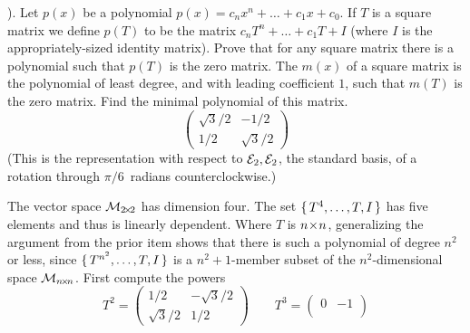 \begin{exercises}
\begin{exparts}
        ).
      \partsitem Let \( p(x) \) be a polynomial 
        \( p(x)=c_nx^n+\dots+c_1x+c_0 \).
        If \( T \) is a square matrix we define \( p(T) \) to be the matrix
        \( c_nT^n+\dots+c_1T+I \)
        (where $I$ is the appropriately-sized identity matrix).
        Prove that for any square matrix there is a polynomial such that
        \( p(T) \) is the zero matrix.
      \partsitem The %
        $m(x)$ of a square matrix is the
        polynomial of least degree, and with leading coefficient \( 1 \),
        such that \( m(T) \) is the zero matrix.
        Find the minimal polynomial of this matrix.
        \begin{equation*}
          \begin{pmatrix}
            \sqrt{3}/2  &-1/2       \\
            1/2         &\sqrt{3}/2
          \end{pmatrix}
        \end{equation*}
        (This is the representation with respect to ${\cal E}_2,{\cal E}_2$, 
        the standard basis, of a rotation through $\pi/6$~radians
        counterclockwise.)
    \end{exparts}
    \begin{answer} 
      \begin{exparts}
         \partsitem The vector space \( \mathcal{M}_{2 \! \times \! 2} \) has dimension
           four. 
           The set \( \mbox{$\{\,T^4,\dots,T,I\,\}$} \) has five
           elements and thus is linearly dependent.
         \partsitem Where \( T \) is \( n \! \times \! n \), 
           generalizing the argument from the
           prior item shows that there is such a polynomial of degree 
           \( n^2 \) or less,
           since \( \mbox{$\{\,T^{n^2},\dots,T,I\,\}$} \) is a \( n^2+1 \)-member
           subset of the $n^2$-dimensional space $\mathcal{M}_{n \! \times \! n}$.
         \partsitem First compute the powers
           \begin{equation*}
              T^2=
              \begin{pmatrix}
                 1/2         &-\sqrt{3}/2  \\
                 \sqrt{3}/2  &1/2
              \end{pmatrix} 
              \qquad
              T^3=
              \begin{pmatrix}
                 0           &-1           \\

\end{pmatrix}
\end{equation*}
\end{exparts}
\end{answer}
\end{exercises}
